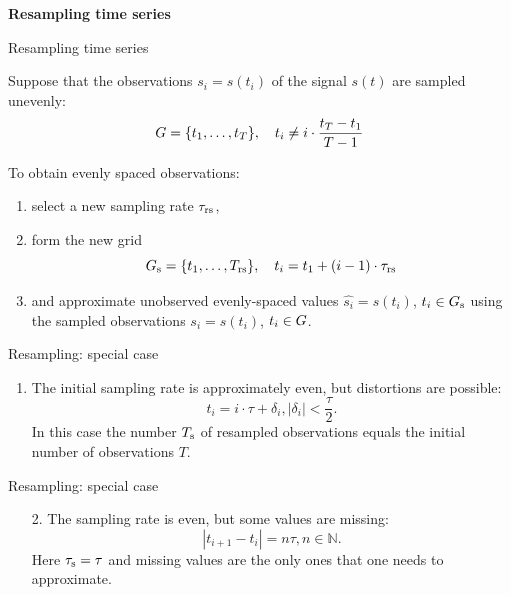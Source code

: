 \documentclass{beamer}
\begin{document}
\begin{frame}
\vfill
\begin{center}
{\Large \bf Resampling time series}
\end{center}
\vfill
\end{frame}
\begin{frame}{Resampling time series}

Suppose that the observations $s_i = s(t_i)$ of the signal $s(t)$ are sampled unevenly:
\[G = \{t_1, \dots, t_T\}, \quad t_i \neq i\cdot\frac{t_T - t_1}{T-1} \]

\bigskip

To obtain evenly spaced observations:
\begin{enumerate}[1)]
\item select a new sampling rate $\tau_{\text{rs}}$, 
\item form the new grid 
\[G_{\text{s}} = \{t_1, \dots, T_{\text{rs}} \}, \quad t_i  = t_1 + (i-1)\cdot\tau_{\text{rs}} \]  
\item and approximate 
unobserved evenly-spaced values $\hat{s_i} = s(t_i)$, $t_i \in G_{\text{s}}$ using the sampled observations $s_i = s(t_i)$, $t_i \in G$.
\end{enumerate}

\end{frame}
\begin{frame}{Resampling: special case}

\begin{enumerate}
\item The initial sampling rate is approximately even, but distortions are possible:
\[ t_i = i\cdot\tau + \delta_i, |\delta_i| < \frac{\tau}{2}.\]
In this case the number $T_{\text{s}}$ of resampled observations equals the initial number of observations $T$.
\end{enumerate}



\end{frame}
\begin{frame}{Resampling: special case}

\begin{enumerate}
\item[2.] The sampling rate is even, but some values are missing:
\[ |t_{i+1} - t_{i}| = n\tau, n \in \mathbb{N}.\]
Here $\tau_{\text{s}} = \tau$ and missing values are the only ones that one needs to approximate.
\end{enumerate}



\end{frame}
\end{document}
